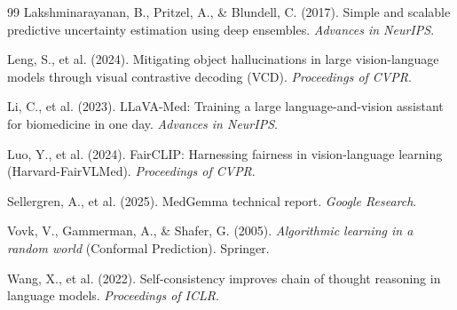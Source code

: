 \documentclass[12pt,a4paper]{article}
\begin{document}
\begin{thebibliography}{99}
Lakshminarayanan, B., Pritzel, A., \& Blundell, C. (2017).
Simple and scalable predictive uncertainty estimation using deep ensembles.
\emph{Advances in NeurIPS}.

Leng, S., et al. (2024).
Mitigating object hallucinations in large vision-language models through visual contrastive decoding (VCD).
\emph{Proceedings of CVPR}.

Li, C., et al. (2023).
LLaVA-Med: Training a large language-and-vision assistant for biomedicine in one day.
\emph{Advances in NeurIPS}.

Luo, Y., et al. (2024).
FairCLIP: Harnessing fairness in vision-language learning (Harvard-FairVLMed).
\emph{Proceedings of CVPR}.

Sellergren, A., et al. (2025).
MedGemma technical report.
\emph{Google Research}.

Vovk, V., Gammerman, A., \& Shafer, G. (2005).
\emph{Algorithmic learning in a random world} (Conformal Prediction).
Springer.

Wang, X., et al. (2022).
Self-consistency improves chain of thought reasoning in language models.
\emph{Proceedings of ICLR}.

\end{thebibliography}
\end{document}
